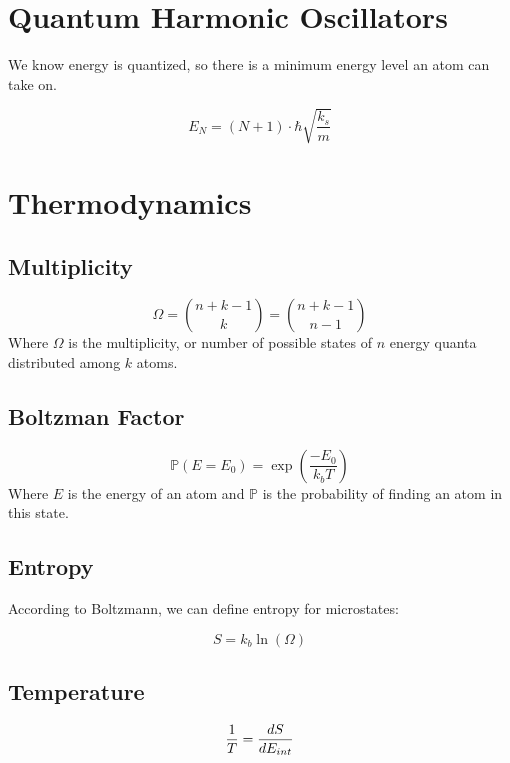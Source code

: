 \documentclass{article}
\begin{document}
\section{Quantum Harmonic Oscillators}
We know energy is quantized, so there is a minimum energy level an atom can take on. 

$$E_N=(N+1)\cdot \hbar\sqrt{\frac{k_s}{m}}$$



\section{Thermodynamics}

\subsection{Multiplicity}
$$\Omega=\binom{n+k-1}{k}=\binom{n+k-1}{n-1}$$
Where $\Omega$ is the multiplicity, or number of possible states of $n$ energy quanta distributed among $k$ atoms.

\subsection{Boltzman Factor}

$$\mathbb{P}(E=E_0)=\exp\left({\frac{-E_0}{k_bT}}\right)$$
Where $E$ is the energy of an atom and $\mathbb{P}$ is the probability of finding an atom in this state.

\subsection{Entropy}

According to Boltzmann, we can define entropy for microstates:

$$S=k_b \ln(\Omega)$$

\subsection{Temperature}

$$\frac{1}{T}=\frac{d{S}}{d{E_{int}}}$$



\
\end{document}
